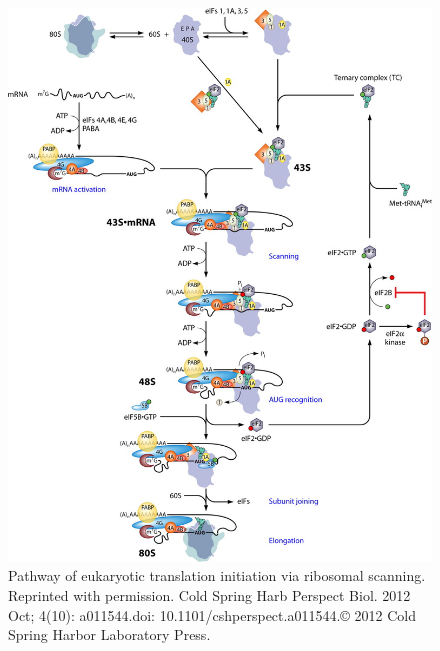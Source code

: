 \documentclass[12pt,openany]{book}
\begin{document}
\begin{figure}[ht]
\centering
\includegraphics[width=1.0\linewidth,height=0.8\textheight]{./figures/initiation.jpg} 
  \caption{Pathway of eukaryotic translation initiation via ribosomal scanning. Reprinted with permission. Cold Spring Harb Perspect Biol. 2012 Oct; 4(10): a011544.doi: 10.1101/cshperspect.a011544.© 2012 Cold Spring Harbor Laboratory Press.
  \label{fig:initiation}}
\end{figure}

\clearpage
\end{document}
